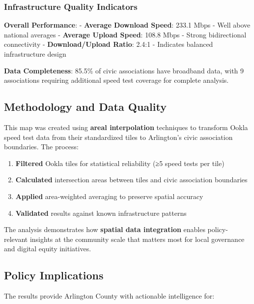 \documentclass[
  letterpaper,
  DIV=11,
  numbers=noendperiod]{scrartcl}
\providecommand{\tightlist}{%
  \setlength{\itemsep}{0pt}\setlength{\parskip}{0pt}}
\begin{document}
\subsubsection{Infrastructure Quality
Indicators}\label{infrastructure-quality-indicators}

\textbf{Overall Performance}: - \textbf{Average Download Speed}: 233.1
Mbps - Well above national averages - \textbf{Average Upload Speed}:
108.8 Mbps - Strong bidirectional connectivity - \textbf{Download/Upload
Ratio}: 2.4:1 - Indicates balanced infrastructure design

\textbf{Data Completeness}: 85.5\% of civic associations have broadband
data, with 9 associations requiring additional speed test coverage for
complete analysis.

\subsection{Methodology and Data
Quality}\label{methodology-and-data-quality}

This map was created using \textbf{areal interpolation} techniques to
transform Ookla speed test data from their standardized tiles to
Arlington's civic association boundaries. The process:

\begin{enumerate}
\def\labelenumi{\arabic{enumi}.}
\tightlist
\item
  \textbf{Filtered} Ookla tiles for statistical reliability (≥5 speed
  tests per tile)
\item
  \textbf{Calculated} intersection areas between tiles and civic
  association boundaries
\item
  \textbf{Applied} area-weighted averaging to preserve spatial accuracy
\item
  \textbf{Validated} results against known infrastructure patterns
\end{enumerate}

The analysis demonstrates how \textbf{spatial data integration} enables
policy-relevant insights at the community scale that matters most for
local governance and digital equity initiatives.

\subsection{Policy Implications}\label{policy-implications}

The results provide Arlington County with actionable intelligence for:
\end{document}
